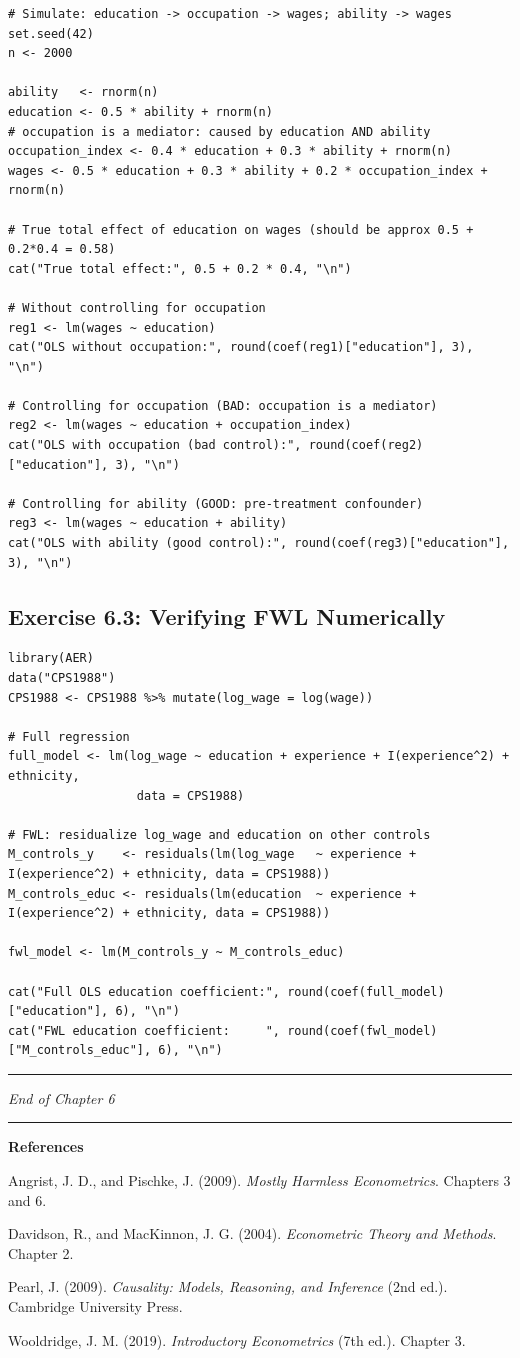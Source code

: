 \begin{lstlisting}
# Simulate: education -> occupation -> wages; ability -> wages
set.seed(42)
n <- 2000

ability   <- rnorm(n)
education <- 0.5 * ability + rnorm(n)
# occupation is a mediator: caused by education AND ability
occupation_index <- 0.4 * education + 0.3 * ability + rnorm(n)
wages <- 0.5 * education + 0.3 * ability + 0.2 * occupation_index + rnorm(n)

# True total effect of education on wages (should be approx 0.5 + 0.2*0.4 = 0.58)
cat("True total effect:", 0.5 + 0.2 * 0.4, "\n")

# Without controlling for occupation
reg1 <- lm(wages ~ education)
cat("OLS without occupation:", round(coef(reg1)["education"], 3), "\n")

# Controlling for occupation (BAD: occupation is a mediator)
reg2 <- lm(wages ~ education + occupation_index)
cat("OLS with occupation (bad control):", round(coef(reg2)["education"], 3), "\n")

# Controlling for ability (GOOD: pre-treatment confounder)
reg3 <- lm(wages ~ education + ability)
cat("OLS with ability (good control):", round(coef(reg3)["education"], 3), "\n")
\end{lstlisting}

\subsection{Exercise 6.3: Verifying FWL Numerically}

\begin{lstlisting}
library(AER)
data("CPS1988")
CPS1988 <- CPS1988 %>% mutate(log_wage = log(wage))

# Full regression
full_model <- lm(log_wage ~ education + experience + I(experience^2) + ethnicity,
                  data = CPS1988)

# FWL: residualize log_wage and education on other controls
M_controls_y    <- residuals(lm(log_wage   ~ experience + I(experience^2) + ethnicity, data = CPS1988))
M_controls_educ <- residuals(lm(education  ~ experience + I(experience^2) + ethnicity, data = CPS1988))

fwl_model <- lm(M_controls_y ~ M_controls_educ)

cat("Full OLS education coefficient:", round(coef(full_model)["education"], 6), "\n")
cat("FWL education coefficient:     ", round(coef(fwl_model)["M_controls_educ"], 6), "\n")
\end{lstlisting}

\medskip\hrule\medskip

\textit{End of Chapter 6}

\medskip\hrule\medskip

\textbf{References}

Angrist, J. D., and Pischke, J. (2009). \textit{Mostly Harmless Econometrics}. Chapters 3 and 6.

Davidson, R., and MacKinnon, J. G. (2004). \textit{Econometric Theory and Methods}. Chapter 2.

Pearl, J. (2009). \textit{Causality: Models, Reasoning, and Inference} (2nd ed.). Cambridge University Press.

Wooldridge, J. M. (2019). \textit{Introductory Econometrics} (7th ed.). Chapter 3.
